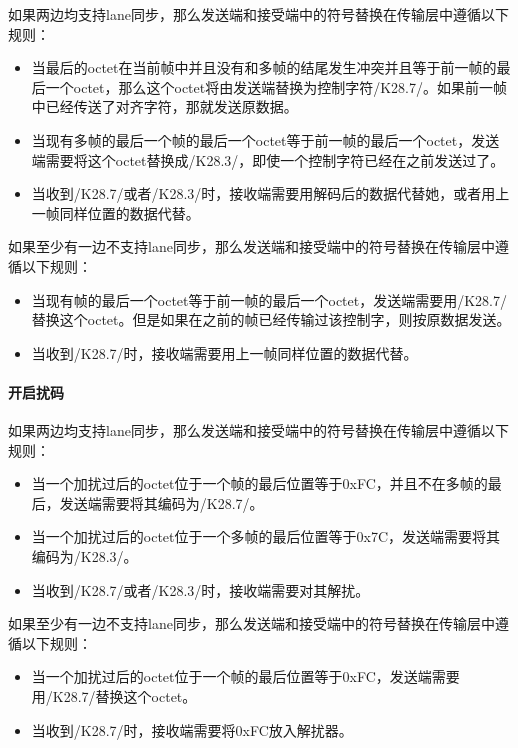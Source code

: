 \documentclass[UTF8]{ctexart}
\begin{document}
如果两边均支持lane同步，那么发送端和接受端中的符号替换在传输层中遵循以下规则：

\begin{itemize}
	\item 当最后的octet在当前帧中并且没有和多帧的结尾发生冲突并且等于前一帧的最后一个octet，那么这个octet将由发送端替换为控制字符/K28.7/。如果前一帧中已经传送了对齐字符，那就发送原数据。
	\item 当现有多帧的最后一个帧的最后一个octet等于前一帧的最后一个octet，发送端需要将这个octet替换成/K28.3/，即使一个控制字符已经在之前发送过了。
	\item 当收到/K28.7/或者/K28.3/时，接收端需要用解码后的数据代替她，或者用上一帧同样位置的数据代替。
\end{itemize}

如果至少有一边不支持lane同步，那么发送端和接受端中的符号替换在传输层中遵循以下规则：

\begin{itemize}
	\item 当现有帧的最后一个octet等于前一帧的最后一个octet，发送端需要用/K28.7/替换这个octet。但是如果在之前的帧已经传输过该控制字，则按原数据发送。
	\item 当收到/K28.7/时，接收端需要用上一帧同样位置的数据代替。
\end{itemize}

\paragraph{开启扰码}

如果两边均支持lane同步，那么发送端和接受端中的符号替换在传输层中遵循以下规则：

\begin{itemize}
	\item 当一个加扰过后的octet位于一个帧的最后位置等于0xFC，并且不在多帧的最后，发送端需要将其编码为/K28.7/。
	\item 当一个加扰过后的octet位于一个多帧的最后位置等于0x7C，发送端需要将其编码为/K28.3/。
	\item 当收到/K28.7/或者/K28.3/时，接收端需要对其解扰。
\end{itemize}

如果至少有一边不支持lane同步，那么发送端和接受端中的符号替换在传输层中遵循以下规则：

\begin{itemize}
	\item 当一个加扰过后的octet位于一个帧的最后位置等于0xFC，发送端需要用/K28.7/替换这个octet。
	\item 当收到/K28.7/时，接收端需要将0xFC放入解扰器。
\end{itemize}
\end{document}
